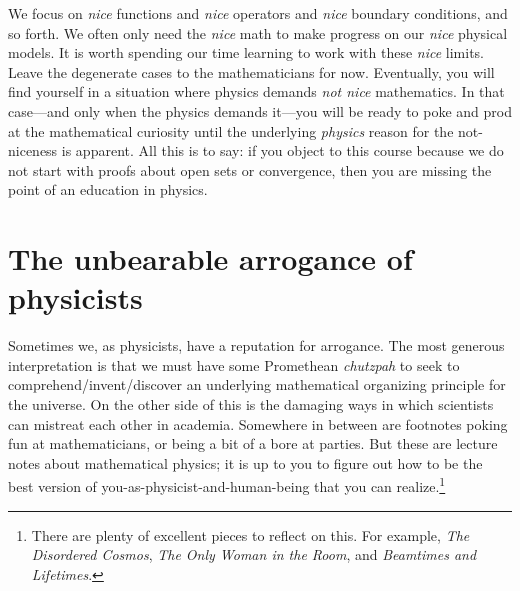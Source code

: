 \documentclass[
  11pt,
	colorful,
	raggedright,
]{tufte-style-thesis-flip}
\begin{document}
We focus on \emph{nice} functions and \emph{nice} operators and \emph{nice} boundary conditions, and so forth. We often only need the \emph{nice} math to make progress on our \emph{nice} physical models. It is worth spending our time learning to work with these \emph{nice} limits. Leave the degenerate cases to the mathematicians for now. Eventually, you will find yourself in a situation where physics demands \emph{not nice} mathematics. In that case---and only when the physics demands it---you will be ready to poke and prod at the mathematical curiosity until the underlying \emph{physics} reason for the not-niceness is apparent. All this is to say: if you object to this course because we do not start with proofs about open sets or convergence, then you are missing the point of an education in physics.

\section{The unbearable arrogance of physicists}
\label{sec:obvious}

Sometimes we, as physicists, have a reputation for arrogance. The most generous interpretation is that we must have some Promethean \emph{chutzpah} to seek to comprehend/invent/discover an underlying mathematical organizing principle for the universe. On the other side of this is the damaging ways in which scientists can mistreat each other in academia. Somewhere in between are footnotes poking fun at mathematicians, or being a bit of a bore at parties. But these are lecture notes about mathematical physics; it is up to you to figure out how to be the best version of you-as-physicist-and-human-being that you can realize.\footnote{There are plenty of excellent pieces to reflect on this. For example, \emph{The Disordered Cosmos}, \emph{The Only Woman in the Room}, and \emph{Beamtimes and Lifetimes}.}
\end{document}
